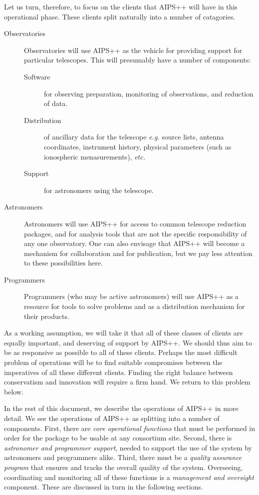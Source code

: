 Let us turn, therefore, to focus on the clients that AIPS++ will have in
this operational phase. These clients split naturally into a number of
catagories.

\begin{description}
\item[Observatories] Observatories will use AIPS++ as the vehicle for
providing support for particular telescopes. This will presumably have
a number of components:
\begin{description}
\item[Software] for observing preparation, monitoring of observations,
and reduction of data.
\item[Distribution] of ancillary data for the telescope {\em e.g.}
source lists, antenna coordinates, instrument history, physical 
parameters (such as ionospheric menasurements), {\em etc.}
\item[Support] for astronomers using the telescope.
\end{description}
\item[Astronomers] Astronomers will use AIPS++ for access to
common telescope reduction packages, and for analysis tools that are
not the specific responsibility of any one observatory. One can also
envisage that AIPS++ will become a mechanism for collaboration and for
publication, but we pay less attention to these possibilities here.
\item[Programmers] Programmers (who may be active astronomers) will use AIPS++
as a resource for tools to solve problems and as a distribution mechanism for
their products.
\end{description}

As a working assumption, we will take it that all of these classes of
clients are equally important, and deserving of support by AIPS++.  We
should thus aim to be as responsive as possible to all of these
clients. Perhaps the most difficult problem of operations will be
to find suitable compromises between the imperatives of all these
different clients. Finding the right balance between conservatism
and innovation will require a firm hand. We return to this problem below.

In the rest of this document, we describe the operations of AIPS++ in
more detail. We see the operations of AIPS++ as splitting into a number of
components. First, there are {\em core operational functions} that
must be performed in order for the package to be usable at any
consortium site. Second, there is {\em astronomer and programmer
support}, needed to support the use of the system by astronomers and
programmers alike. Third, there must be a {\em quality assurance
program} that ensures and tracks the overall quality of the system.
Overseeing, coordinating and monitoring all of these functions is a
{\em management and oversight} component. These are discussed in
turn in the following sections.

